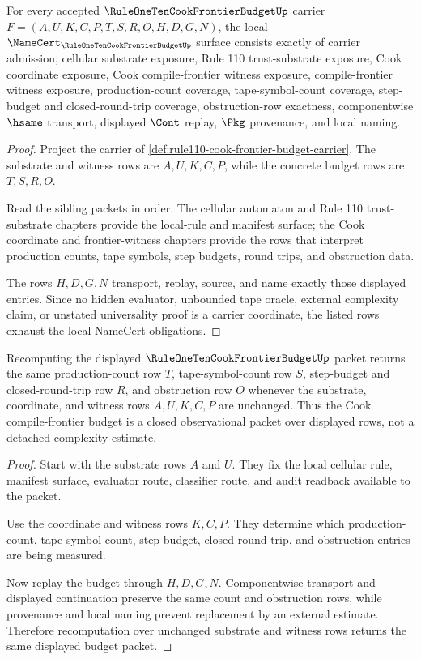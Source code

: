 \begin{theorem}
\label{thm:rule110-cook-frontier-budget-namecert-obligations}
For every accepted $\RuleOneTenCookFrontierBudgetUp$ carrier $F=(A,U,K,C,P,T,S,R,O,H,D,G,N)$, the local $\NameCert_{\RuleOneTenCookFrontierBudgetUp}$ surface consists exactly of carrier admission, cellular substrate exposure, Rule 110 trust-substrate exposure, Cook coordinate exposure, Cook compile-frontier witness exposure, compile-frontier witness exposure, production-count coverage, tape-symbol-count coverage, step-budget and closed-round-trip coverage, obstruction-row exactness, componentwise $\hsame$ transport, displayed $\Cont$ replay, $\Pkg$ provenance, and local naming.
\end{theorem}
\begin{proof}
Project the carrier of \autoref{def:rule110-cook-frontier-budget-carrier}. The substrate and witness rows are $A,U,K,C,P$, while the concrete budget rows are $T,S,R,O$.

Read the sibling packets in order. The cellular automaton and Rule 110 trust-substrate chapters provide the local-rule and manifest surface; the Cook coordinate and frontier-witness chapters provide the rows that interpret production counts, tape symbols, step budgets, round trips, and obstruction data.

The rows $H,D,G,N$ transport, replay, source, and name exactly those displayed entries. Since no hidden evaluator, unbounded tape oracle, external complexity claim, or unstated universality proof is a carrier coordinate, the listed rows exhaust the local NameCert obligations.
\end{proof}

\begin{theorem}
\label{thm:rule110-cook-frontier-budget-closed-observation}
Recomputing the displayed $\RuleOneTenCookFrontierBudgetUp$ packet returns the same production-count row $T$, tape-symbol-count row $S$, step-budget and closed-round-trip row $R$, and obstruction row $O$ whenever the substrate, coordinate, and witness rows $A,U,K,C,P$ are unchanged. Thus the Cook compile-frontier budget is a closed observational packet over displayed rows, not a detached complexity estimate.
\end{theorem}
\begin{proof}
Start with the substrate rows $A$ and $U$. They fix the local cellular rule, manifest surface, evaluator route, classifier route, and audit readback available to the packet.

Use the coordinate and witness rows $K,C,P$. They determine which production-count, tape-symbol-count, step-budget, closed-round-trip, and obstruction entries are being measured.

Now replay the budget through $H,D,G,N$. Componentwise transport and displayed continuation preserve the same count and obstruction rows, while provenance and local naming prevent replacement by an external estimate. Therefore recomputation over unchanged substrate and witness rows returns the same displayed budget packet.
\end{proof}

